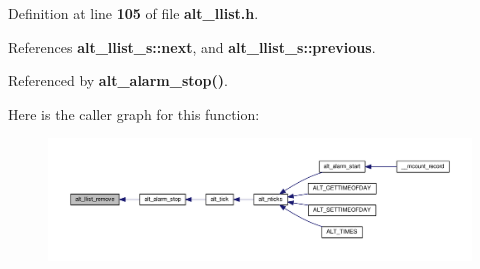 Definition at line {\bf 105} of file {\bf alt\+\_\+llist.\+h}.



References {\bf alt\+\_\+llist\+\_\+s\+::next}, and {\bf alt\+\_\+llist\+\_\+s\+::previous}.



Referenced by {\bf alt\+\_\+alarm\+\_\+stop()}.



Here is the caller graph for this function\+:
\nopagebreak
\begin{figure}[H]
\begin{center}
\leavevmode
\includegraphics[width=350pt]{d5/df5/alt__llist_8h_ade7f3c15bec567f0cc0d4629ee1e8e09_icgraph}
\end{center}
\end{figure}


